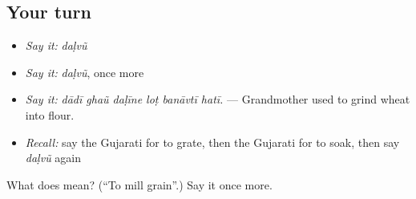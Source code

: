 \subsection*{Your turn}
\begin{itemize}
\raggedright
  \item \emph{Say it:} \emph{daḷvũ}
  \item \emph{Say it:} \emph{daḷvũ}, once more
  \item \emph{Say it:} \emph{dādī ghaũ daḷīne loṭ banāvtī hatī.} — Grandmother used to grind wheat into flour.
  \item \emph{Recall:} say the Gujarati for to grate, then the Gujarati for to soak, then say \emph{daḷvũ} again
\end{itemize}

\begin{tcolorbox}[breakable,colback=teal!4,colframe=teal!35!black,title={Before you move on}]
What does  mean? (\textquotedblleft{}To mill grain\textquotedblright{}.) Say it once more.
\end{tcolorbox}
